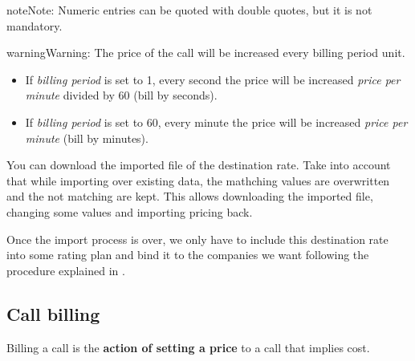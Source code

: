\documentclass[letterpaper,10pt,english]{sphinxmanual}
\begin{document}
\begin{notice}{note}{Note:}
Numeric entries can be quoted with double quotes, but it is
not mandatory.
\end{notice}

\begin{notice}{warning}{Warning:}
The price of the call will be increased every billing period unit.
\begin{itemize}
\item {} 
If \emph{billing period} is set to 1, every second the price will be increased
\emph{price per minute} divided by 60 (bill by seconds).

\item {} 
If \emph{billing period} is set to 60, every minute the price will be increased
\emph{price per minute} (bill by minutes).

\end{itemize}
\end{notice}

You can download the imported file of the destination rate. Take into account that while importing
over existing data, the mathching values are overwritten and the not matching are kept. This allows
downloading the imported file, changing some values and importing pricing back.

Once the import process is over, we only have to include this destination rate into some
rating plan and bind it to the companies we want following the procedure explained in
{\hyperref[brand/billing/rating_plans:rating\string-plans]{}}.


\subsection{Call billing}
\label{brand/billing/bill_a_call::doc}\label{brand/billing/bill_a_call:call-billing}
Billing a call is the \textbf{action of setting a price} to a call that implies cost.
\end{document}
